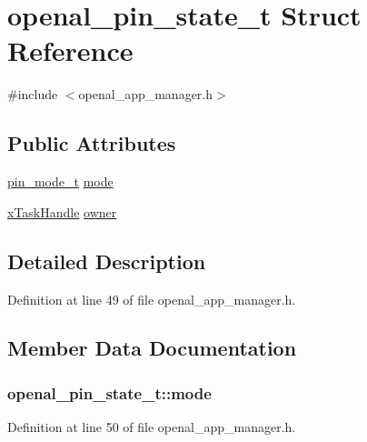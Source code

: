 \hypertarget{structopenal__pin__state__t}{}\section{openal\+\_\+pin\+\_\+state\+\_\+t Struct Reference}
\label{structopenal__pin__state__t}


{\ttfamily \#include $<$openal\+\_\+app\+\_\+manager.\+h$>$}

\subsection*{Public Attributes}
\begin{DoxyCompactItemize}
\item 
\hyperlink{pins_8h_a77fecc1883f27c095012fbe56345c4db}{pin\+\_\+mode\+\_\+t} \hyperlink{structopenal__pin__state__t_a5e74e0e57e811ec327234cee1fe67351}{mode}
\item 
\hyperlink{_free_r_t_o_s_8h_af7cd8f53b62f0c497b442b504c30f2ec}{x\+Task\+Handle} \hyperlink{structopenal__pin__state__t_a76e4815d53099f9f30deb212044ba3d8}{owner}
\end{DoxyCompactItemize}


\subsection{Detailed Description}


Definition at line 49 of file openal\+\_\+app\+\_\+manager.\+h.



\subsection{Member Data Documentation}
\subsubsection[{\texorpdfstring{mode}{mode}}]{ openal\+\_\+pin\+\_\+state\+\_\+t\+::mode}\hypertarget{structopenal__pin__state__t_a5e74e0e57e811ec327234cee1fe67351}{}\label{structopenal__pin__state__t_a5e74e0e57e811ec327234cee1fe67351}


Definition at line 50 of file openal\+\_\+app\+\_\+manager.\+h.

